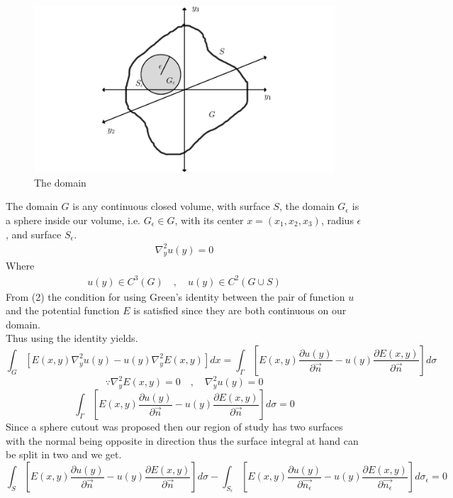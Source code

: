 \begin{figure}[h]
\begin{center}
\includegraphics[scale=0.15]{rep.png}
\captionlabelfalse
\caption{The domain}
\end{center}
\end{figure}
\par
The domain $G$ is any continuous closed volume, with surface $S$, the domain $G_\epsilon$ is a sphere inside our volume, i.e. $G_\epsilon \in G$, with its center $x = (x_1,x_2,x_3)$, radius $\epsilon$, and surface $S_\epsilon$.    
\begin{align}
\nabla_{y}^{2} u(y) =0
\end{align}
Where
\begin{align}
u(y) \in C^3(G) \quad,\quad u(y) \in C^2(G\cup S)
\end{align}
From (2) the condition for using Green's identity between the pair of function $u$ and the potential function $E$ is satisfied since they are both continuous on our domain. 
\\
Thus using the identity yields.
\[
    \int_G \left[E(x,y)\nabla_{y}^{2} u(y) - u(y)\nabla_{y}^{2} E(x,y)\right]dx = \int_\Gamma \left[E(x,y)\frac{\partial u(y)}{\partial \vec{n}}-u(y)\frac{\partial E(x,y)}{\partial \vec{n}}\right] d\sigma    
\]
\[
  \because \nabla_{y}^{2} E(x,y) = 0  \quad,\quad  \nabla_{y}^{2} u(y) =0
\]
\[
    \int_\Gamma \left[E(x,y)\frac{\partial u(y)}{\partial \vec{n}}-u(y)\frac{\partial E(x,y)}{\partial \vec{n}}\right] d\sigma = 0    
\]
Since a sphere cutout was proposed then our region of study has two surfaces with the normal being opposite in direction thus the surface integral at hand can be split in two and we get.
\[
    \int_S \left[E(x,y)\frac{\partial u(y)}{\partial \vec{n}}-u(y)\frac{\partial E(x,y)}{\partial \vec{n}}\right] d\sigma - \int_{S_\epsilon} \left[E(x,y)\frac{\partial u(y)}{\partial \vec{n_\epsilon}}-u(y)\frac{\partial E(x,y)}{\partial \vec{n_\epsilon}}\right] d\sigma_\epsilon  = 0    
\]
